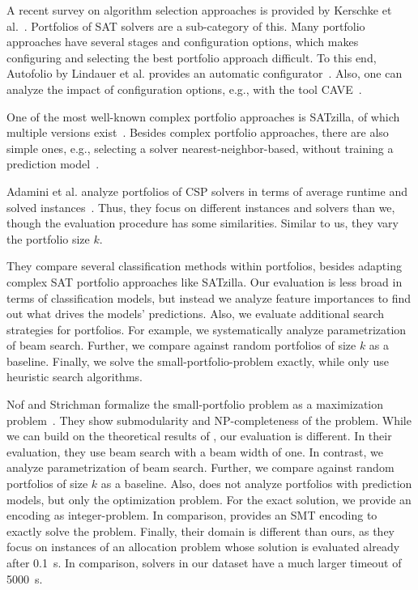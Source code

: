 \documentclass[conference]{IEEEtran}
\begin{document}

A recent survey on algorithm selection approaches is provided by Kerschke et al.~\cite{kerschke2019automated}. 
Portfolios of SAT solvers are a sub-category of this. 
Many portfolio approaches have several stages and configuration options, which makes configuring and selecting the best portfolio approach difficult.
To this end, Autofolio by Lindauer et al. provides an automatic configurator~\cite{lindauer2015autofolio}.
Also, one can analyze the impact of configuration options, e.g., with the tool CAVE~\cite{biedenkapp2018cave}. 

One of the most well-known complex portfolio approaches is SATzilla, of which multiple versions exist~\cite{xu2008satzilla, xu2012satzilla2012}. 
Besides complex portfolio approaches, there are also simple ones, e.g., selecting a solver nearest-neighbor-based, without training a prediction model~\cite{malitsky2011non, nikolic2013simple, samulowitz2013snappy}.

Adamini et al. analyze portfolios of CSP solvers in terms of average runtime and solved instances~\cite{amadini2014empirical, amadini2016extensive}. 
Thus, they focus on different instances and solvers than we, though the evaluation procedure has some similarities.
Similar to us, they vary the portfolio size $k$.

They compare several classification methods within portfolios, besides adapting complex SAT portfolio approaches like SATzilla.
Our evaluation is less broad in terms of classification models, but instead we analyze feature importances to find out what drives the models' predictions.
Also, we evaluate additional search strategies for portfolios.
For example, we systematically analyze parametrization of beam search.
Further, we compare against random portfolios of size $k$ as a baseline.
Finally, we solve the small-portfolio-problem exactly, while \cite{amadini2014empirical} only use heuristic search algorithms.

Nof and Strichman formalize the small-portfolio problem as a maximization problem~\cite{nof2020real}. 
They show submodularity and NP-completeness of the problem.
While we can build on the theoretical results of \cite{nof2020real}, our evaluation is different.
In their evaluation, they use beam search with a beam width of one.
In contrast, we analyze parametrization of beam search.
Further, we compare against random portfolios of size $k$ as a baseline.
Also, \cite{nof2020real} does not analyze portfolios with prediction models, but only the optimization problem.
For the exact solution, we provide an encoding as integer-problem.
In comparison, \cite{nof2020real} provides an SMT encoding to exactly solve the problem.
Finally, their domain is different than ours, as they focus on instances of an allocation problem whose solution is evaluated already after 0.1~s.
In comparison, solvers in our dataset have a much larger timeout of 5000~s.
\end{document}
